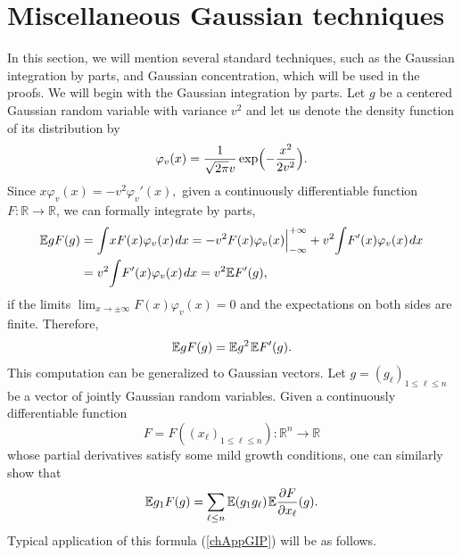 \documentclass[12pt]{article}
\newcommand{\smsp}{\hspace{0.3mm}}
\newcommand{\e}{\mathbb{E}}
\newcommand{\Reals}{\mathbb{R}}
\theoremstyle{nonumberplain}
\begin{document}
\pagebreak




\section{Miscellaneous Gaussian techniques} \label{chAppGipSectionLabel}

In this section, we will mention several standard techniques, such as the Gaussian integration by parts, and Gaussian concentration, which will be used in the proofs. We will begin with the Gaussian integration by parts. Let $g$ be a centered Gaussian random variable with variance $v^2$ and let us denote the density function of its distribution by
\begin{equation}
\varphi_v(x) = \frac{1}{\sqrt{2\pi}v}\exp\Bigl(-\frac{x^2}{2v^2}\Bigr).
\end{equation}
Since $x\varphi_v(x) = -v^2 \varphi_v'(x),$ given a continuously differentiable function $F:\Reals \to \Reals$, we can formally integrate by parts,
\begin{align*}
\e g F(g) 
& = 
 \int\! x F(x) \varphi_v(x)  \smsp dx
=
- v^2 F(x) \varphi_v(x) \Bigr|_{-\infty}^{+\infty}
+
v^2 \!\int\! F'(x) \varphi_v(x) \smsp dx
\\
& = 
v^2 \!\int\! F'(x) \varphi_v(x) \smsp dx
=
v^2\e F'(g), 
\end{align*}
if the limits $\lim_{x\to \pm \infty} F(x) \varphi_v(x) = 0$ and the expectations on both sides are finite. Therefore,
\begin{equation}
\e g F(g) = \e g^2 \smsp \e F'(g).
\label{chAppGip}
\end{equation}
This computation can be generalized to Gaussian vectors. Let $g = (g_\ell)_{1\leq \ell\leq n}$ be a vector of jointly Gaussian random variables. Given a continuously differentiable function
$$
F=F((x_\ell)_{1\leq \ell\leq n}): \Reals^n \to \Reals
$$
whose partial derivatives satisfy some mild growth conditions, one can similarly show that
\begin{equation}
\e g_1 F(g)
=
\sum_{\ell\leq n} \e (g_1 g_\ell) \smsp \e \frac{\partial F}{\partial x_\ell} (g).
\label{chAppGIP}
\end{equation}
Typical application of this formula (\ref{chAppGIP}) will be as follows. 
\end{document}
